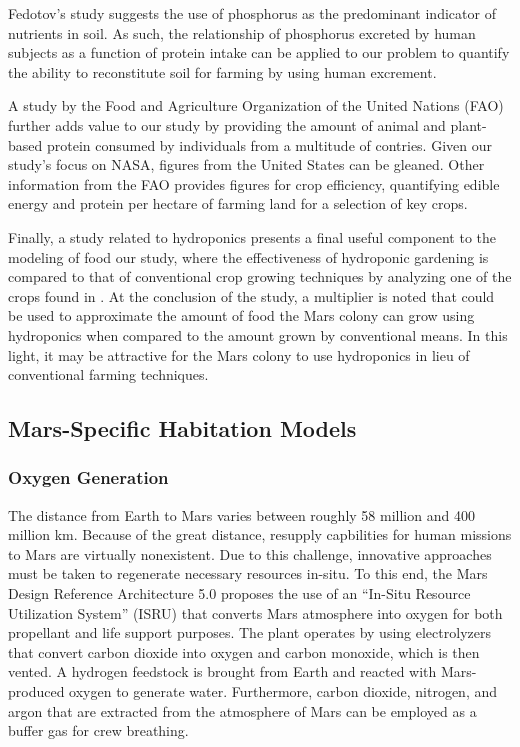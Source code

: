 \documentclass[12pt]{article}
\begin{document}
Fedotov's study \cite{fedotov2008stochastic} suggests the use of phosphorus as
the predominant indicator of nutrients in soil. As such, the relationship of
phosphorus excreted by human subjects as a function of protein intake
\cite{pooOnYOu} can be applied to our problem to quantify the ability to
reconstitute soil for farming by using human excrement.

A study by the Food and Agriculture Organization of the United Nations (FAO)
\cite{faoProtein} further adds value to our study by providing the
amount of animal and plant-based protein consumed by individuals from a
multitude of contries. Given our study's focus on NASA, figures from the United
States can be gleaned. Other information from the FAO \cite{faoNutrition}
provides figures for crop efficiency, quantifying edible energy
and protein per hectare of farming land for a selection of key crops.

Finally, a study related to hydroponics \cite{iHeartHydroponics} presents a
final useful component to the modeling of food our study, where the
effectiveness of hydroponic gardening is compared to that of conventional crop
growing techniques by analyzing one of the crops found in \cite{faoNutrition}.
At the conclusion of the study, a multiplier is noted that could be used to
approximate the amount of food the Mars colony can grow using hydroponics when
compared to the amount grown by conventional means. In this light, it may be
attractive for the Mars colony to use hydroponics in lieu of conventional
farming techniques.

\subsection{Mars-Specific Habitation Models}

\subsubsection{Oxygen Generation}

The distance from Earth to Mars varies between roughly 58 million and 400
million km. Because of the great distance, resupply capbilities for human
missions to Mars are virtually nonexistent. Due to this challenge, innovative
approaches must be taken to regenerate necessary resources in-situ. To this end,
the Mars Design Reference Architecture 5.0 \cite{drake2010human} proposes
the use of an ``In-Situ Resource Utilization System'' (ISRU) that converts Mars
atmosphere into oxygen for both propellant and life support purposes. The plant
operates by using electrolyzers that convert carbon dioxide into oxygen and
carbon monoxide, which is then vented. A hydrogen feedstock is brought from
Earth and reacted with Mars-produced oxygen to generate water. Furthermore,
carbon dioxide, nitrogen, and argon that are extracted from the atmosphere of
Mars can be employed as a buffer gas for crew breathing.
\end{document}
